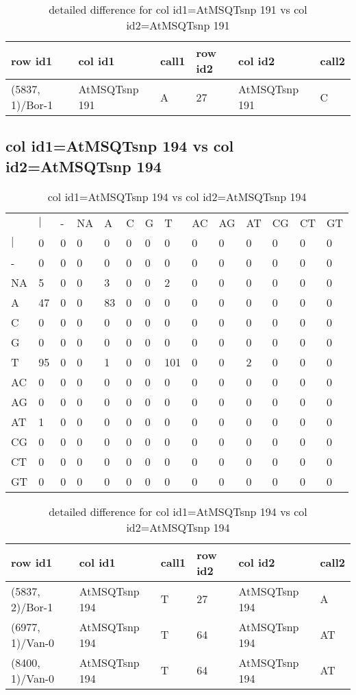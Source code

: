 \begin{center}
\begin{longtable}{|l|l|l|l|l|l|}
\caption{detailed difference for col id1=AtMSQTsnp 191 vs col id2=AtMSQTsnp 191} \label{table_dm759}\\
\hline
row id1&col id1&call1&row id2&col id2&call2\\
\hline
(5837, 1)/Bor-1&AtMSQTsnp 191&A&27&AtMSQTsnp 191&C\\
\hline
\end{longtable}
\end{center}

\subsection{col id1=AtMSQTsnp 194 vs col id2=AtMSQTsnp 194}
\begin{center}
\begin{longtable}{|l|l|l|l|l|l|l|l|l|l|l|l|l|l|}
\caption{col id1=AtMSQTsnp 194 vs col id2=AtMSQTsnp 194} \label{table_dm760}\\
\hline
\\
\hline
&$|$&-&NA&A&C&G&T&AC&AG&AT&CG&CT&GT\\
$|$&0&0&0&0&0&0&0&0&0&0&0&0&0\\
-&0&0&0&0&0&0&0&0&0&0&0&0&0\\
NA&5&0&0&3&0&0&2&0&0&0&0&0&0\\
A&47&0&0&83&0&0&0&0&0&0&0&0&0\\
C&0&0&0&0&0&0&0&0&0&0&0&0&0\\
G&0&0&0&0&0&0&0&0&0&0&0&0&0\\
T&95&0&0&1&0&0&101&0&0&2&0&0&0\\
AC&0&0&0&0&0&0&0&0&0&0&0&0&0\\
AG&0&0&0&0&0&0&0&0&0&0&0&0&0\\
AT&1&0&0&0&0&0&0&0&0&0&0&0&0\\
CG&0&0&0&0&0&0&0&0&0&0&0&0&0\\
CT&0&0&0&0&0&0&0&0&0&0&0&0&0\\
GT&0&0&0&0&0&0&0&0&0&0&0&0&0\\
\hline
\end{longtable}
\end{center}

\begin{center}
\begin{longtable}{|l|l|l|l|l|l|}
\caption{detailed difference for col id1=AtMSQTsnp 194 vs col id2=AtMSQTsnp 194} \label{table_dm761}\\
\hline
row id1&col id1&call1&row id2&col id2&call2\\
\hline
(5837, 2)/Bor-1&AtMSQTsnp 194&T&27&AtMSQTsnp 194&A\\
(6977, 1)/Van-0&AtMSQTsnp 194&T&64&AtMSQTsnp 194&AT\\
(8400, 1)/Van-0&AtMSQTsnp 194&T&64&AtMSQTsnp 194&AT\\
\hline
\end{longtable}
\end{center}

